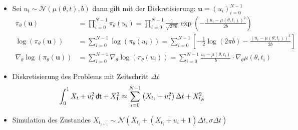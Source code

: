 \documentclass[a4paper, 12pt]{scrartcl}
\newcommand{\dt}{\thinspace \mathsf{dt}}
\begin{document}
\begin{beispiel}
\begin{itemize}
        \item[2.] Sei $u_t \sim \mathcal{N}
            \left(
                \mu(\theta,t), b
            \right)$
        dann gilt mit der Diskretisierung: $\bm{u} = \left( u_{i} \right)_{i=0}^{N-1}$
        \begin{align*}
            \pi_{\theta}(\bm{u})
            &=
            \prod_{i=0}^{N-1}
            \pi_{\theta}(u_{i})
            = 
            \prod_{i=0}^{N-1}
            \frac{1}{\sqrt{2 \pi b}}
            \exp
            \left(
                -\frac{(u_{i} - \mu(\theta,t_i))^2}{2b}
            \right)
            \\
            \log(\pi_{\theta}(\bm{u}))
            &=
            \sum_{i=0}^{N-1}
            \log(\pi_{\theta}(u_{i}))
            =
            \sum_{i=0}^{N-1}
            \left[
                -\frac{1}{2} \log(2 \pi b) 
                - \frac{(u_{i} - \mu(\theta,t_i))^2}{2b} 
            \right]
            \\
            \nabla_{\theta}
            \log(\pi_{\theta}(\bm{u}))
            &= 
            \sum_{i=0}^{N-1}
            \nabla_{\theta}
            \log(\pi_{\theta}(u_{i}))
            =
            \sum_{i=0}^{N-1} \frac{u_{i} - \mu(\theta,t_i)}{b} 
            \cdot \nabla_{\theta} \mu(\theta,t_i)
        \end{align*}

        \item[3.] Diskretisierung des Problems mit Zeitschritt $\Delta t$
        \begin{align}
            \int_0^1 X_t +u_t^2  \dt + X_1^2  
            \approx
            \sum_{i=0}^{N-1}
            \left(
                X_{t_i} + u_{i}^2
            \right) \Delta t 
            + X_{t_N}^2
        \end{align}

        \item[4.] Simulation des Zustandes 
        $X_{t_{i+1}} \sim \mathcal{N}\left(X_{t_i} + (X_{t_i}+u_{i}+1) \Delta t , \sigma \Delta t \right)$


\end{itemize}
\end{beispiel}
\end{document}
